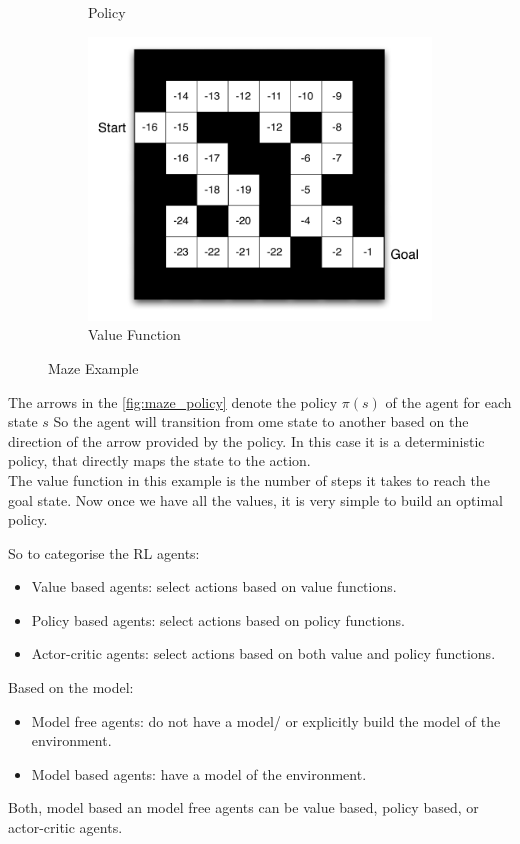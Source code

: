 \begin{example}
\begin{figure}[H]
\begin{subfigure}[b]{0.3\textwidth}
            \caption{Policy}
            \label{fig:maze_policy}
        \end{subfigure}
        \begin{subfigure}[b]{0.3\textwidth}
            \includegraphics[width=\textwidth]{figures/maze_value.png}
            \caption{Value Function}
            \label{fig:maze_value_function}
        \end{subfigure}
        \caption{Maze Example}
    \end{figure}

    The arrows in the \autoref{fig:maze_policy} denote the policy
    \(\pi (s)\) of the agent for each state \(s\)  So the agent will transition from ome state to another based on
    the direction of the arrow provided by the policy. In this case it is a 
    deterministic policy, that directly maps the state to the action.\\
    The value function in this example is the number of steps 
    it takes to reach the goal state.
    Now once we have all the values, it is very simple to build an optimal policy. 

\end{example}

So to categorise the RL agents:
\begin{itemize}
    \item Value based agents: select actions based on value functions.
    \item Policy based agents: select actions based on policy functions.
    \item Actor-critic agents: select actions based on both value and policy functions.
\end{itemize}
Based on the model:
\begin{itemize}
    \item Model free agents: do not have a model/ or explicitly build the model of the environment.
    \item Model based agents: have a model of the environment.
\end{itemize}
Both, model based an model free agents can be value based, policy based, or actor-critic agents.


